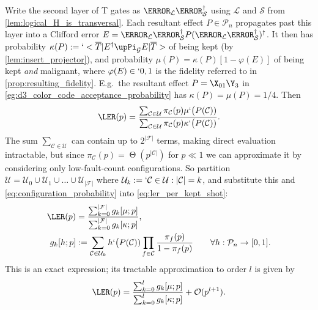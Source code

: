 Write the second layer of T gates as $\T_{\mathcal L} \T^\dag_{\mathcal S}$
using $\mathcal L$ and $\mathcal S$ from \cref{lem:logical_H_is_transversal}.
Each resultant effect $P \in \mathcal P_n$
propagates past this layer into a Clifford error $E =\T_{\mathcal L} \T^\dag_{\mathcal S}
P (\T_{\mathcal L} \T^\dag_{\mathcal S})^\dag$.
It then has
probability $\kappa(P) :=`<\overline{T}| E^\dag \upPi_{\mathcal G}E |\overline{T}>$
of being kept (by \cref{lem:insert_projector}),
and probability $\mu(P) =\kappa(P)[1 -\varphi(E)]$ of being kept \emph{and} malignant,
where $\varphi(E) \in `{0, 1}$ is the fidelity referred to in \cref{prop:resulting_fidelity}.
E.g.\ the resultant effect $P =\X_{01}\Y_3$ in
\cref{eg:d3_color_code_acceptance_probability}
has $\kappa(P) =\mu(P) =1/4$.
Then
\begin{equation}
	\LER(p)
	=\frac
	{\sum_{\mathcal{C} \in \mathcal{U}} \pi_\mathcal{C}(p) \mu`\big(P(\mathcal{C}))}
	{\sum_{\mathcal{C} \in \mathcal{U}} \pi_\mathcal{C}(p) \kappa`\big(P(\mathcal{C}))}.
	\label{eq:ler_per_kept_shot}
\end{equation}
The sum $\sum_{\mathcal{C} \in \mathcal{U}}$ can contain up to $2^{|\mathcal F|}$ terms,
making direct evaluation intractable,
but since $\pi_\mathcal{C}(p) =\upTheta(p^{|\mathcal{C}|})$ for $p \ll 1$
we can approximate it by considering only low-fault-count configurations.
So partition $\mathcal{U} =\mathcal{U}_0 \cup \mathcal{U}_1 \cup \dots \cup \mathcal{U}_{|\mathcal F|}$
where $\mathcal{U}_k :=`{\mathcal{C} \in \mathcal{U}: |\mathcal{C}| =k}$,
and substitute this and \cref{eq:configuration_probability}
into \cref{eq:ler_per_kept_shot}:
\begin{align}
	\LER(p)
	&=\frac
	{\sum_{k=0}^{|\mathcal{F}|} g_k[\mu; p]}
	{\sum_{k=0}^{|\mathcal{F}|} g_k[\kappa; p]}, \\
	g_k[h; p]
	&:=\sum_{\mathcal{C} \in \mathcal{U}_k} h`\big(P(\mathcal{C}))
	\prod_{f \in \mathcal{C}} \frac{\pi_f(p)}{1 -\pi_f(p)}
	\qquad\forall h:\mathcal P_n \to [0, 1].
\end{align}
This is an exact expression;
its tractable approximation to order $l$ is given by
\begin{equation}
	\LER(p) =\frac
	{\sum_{k=0}^l g_k[\mu; p]}
	{\sum_{k=0}^l g_k[\kappa; p]} +\mathcal{O}(p^{l +1}).
\end{equation}